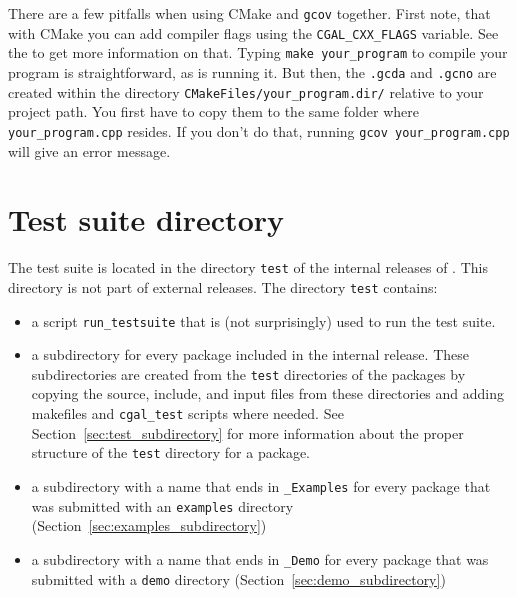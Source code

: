 There are a few pitfalls when using CMake and \texttt{gcov} together.
First note, that with CMake you can add compiler flags using the \texttt{CGAL_CXX_FLAGS} variable. See the
 to get more information on that. Typing \texttt{make your_program} to compile your program is straightforward, as is running it. But then, the \texttt{.gcda}
and \texttt{.gcno} are created within the directory \texttt{CMakeFiles/your_program.dir/} relative to your project path. You first have to copy them to the same folder where \texttt{your_program.cpp} resides.
If you don't do that, running \texttt{gcov your_program.cpp} will give an error
message.


\section{Test suite directory\label{sec:test_suite_directory}}

The test suite is located in the directory {\tt test} of the internal 
releases of \cgal. This directory is not part of external releases. The 
directory {\tt test} 
contains:
\begin{itemize}
   \item a script {\tt run\_testsuite}
         that is (not surprisingly) used to run the test suite.
   \item a subdirectory for every package included in the internal release.
         These subdirectories are created from the {\tt test} directories
         of the packages by copying the source, include, and input files from 
         these directories and adding makefiles and {\tt cgal\_test} scripts 
         where needed.  See Section~\ref{sec:test_subdirectory} for more
         information about the proper structure of the {\tt test} directory
         for a package.
   \item a subdirectory with a name that ends in {\tt \_Examples} for every 
         package that was submitted with an {\tt examples} directory 
         (Section~\ref{sec:examples_subdirectory})
   \item a subdirectory with a name that ends in {\tt \_Demo} for every
         package that was submitted with a {\tt demo} directory
         (Section~\ref{sec:demo_subdirectory})
\end{itemize}

